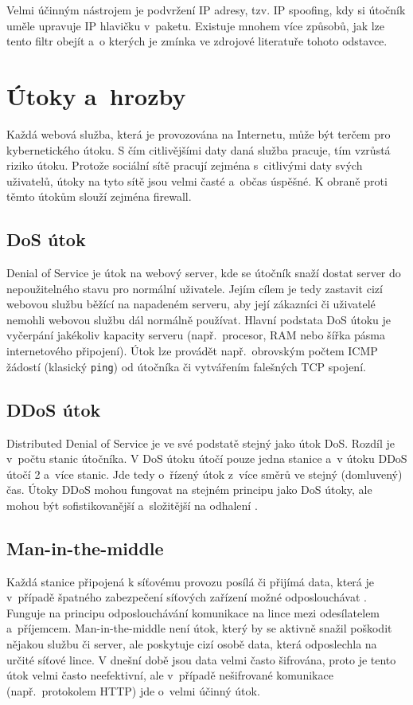 Velmi účinným nástrojem je podvržení IP adresy, tzv. IP spoofing, kdy si útočník uměle upravuje IP hlavičku v~paketu. Existuje mnohem více způsobů, jak lze tento filtr obejít a~o kterých je zmínka ve zdrojové literatuře tohoto odstavce.

\section{Útoky a~hrozby}
Každá webová služba, která je provozována na Internetu, může být terčem pro kybernetického útoku. S čím citlivějšími daty daná služba pracuje, tím vzrůstá riziko útoku. Protože sociální sítě pracují zejména s~citlivými daty svých uživatelů, útoky na tyto sítě jsou velmi časté a~občas úspěšné. K obraně proti těmto útokům slouží zejména firewall.

\subsection*{DoS útok}
\label{sec:DoS_force}
Denial of Service je útok na webový server, kde se útočník snaží dostat server do nepoužitelného stavu pro normální uživatele. Jejím cílem je tedy zastavit cizí webovou službu běžící na napadeném serveru, aby její zákazníci či uživatelé nemohli webovou službu dál normálně používat. Hlavní podstata DoS útoku je vyčerpání jakékoliv kapacity serveru (např.~procesor, RAM nebo šířka pásma internetového připojení). Útok lze provádět např.~obrovským počtem ICMP žádostí (klasický \texttt{ping}) od útočníka či vytvářením falešných TCP spojení.

\subsection*{DDoS útok}
\label{sec:DDoS_force}
Distributed Denial of Service je ve své podstatě stejný jako útok DoS. Rozdíl je v~počtu stanic útočníka. V DoS útoku útočí pouze jedna stanice a~v útoku DDoS útočí 2 a~více stanic. Jde tedy o~řízený útok z~více směrů ve stejný (domluvený) čas. Útoky DDoS mohou fungovat na stejném principu jako DoS útoky, ale mohou být sofistikovanější a~složitější na odhalení \cite{bib:ddos}. 

\subsection*{Man-in-the-middle}
Každá stanice připojená k síťovému provozu posílá či přijímá data, která je v~případě špatného zabezpečení síťových zařízení možné odposlouchávat \cite{bib:kyber_utoky}. Funguje na principu odposlouchávání komunikace na lince mezi odesílatelem a~příjemcem. Man-in-the-middle není útok, který by se aktivně snažil poškodit nějakou službu či server, ale poskytuje cizí osobě data, která odposlechla na určité síťové lince. V dnešní době jsou data velmi často šifrována, proto je tento útok velmi často neefektivní, ale v~případě nešifrované komunikace (např.~protokolem HTTP) jde o~velmi účinný útok.

